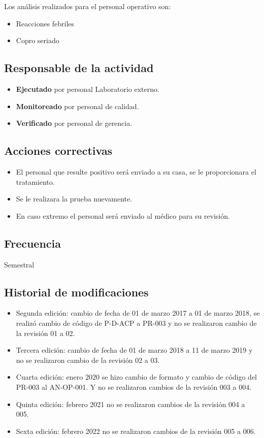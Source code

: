 Los análisis realizados para el personal operativo son:

\begin{itemize}
	\item Reacciones febriles
	\item Copro seriado
\end{itemize}

\subsection{Responsable de la actividad}

\begin{itemize}
	\item \textbf{Ejecutado} por personal Laboratorio externo.
	\item \textbf{Monitoreado} por personal de calidad.
	\item \textbf{Verificado} por personal de gerencia.
\end{itemize}

\subsection{Acciones correctivas}

\begin{itemize}
	\item El personal que resulte positivo será enviado a su casa, se le proporcionara el tratamiento.
	\item Se le realizara la prueba nuevamente.
	\item En caso extremo el personal será enviado al médico para su revisión.
\end{itemize}

\subsection{Frecuencia}

Semestral

\subsection{Historial de modificaciones}

\begin{itemize}
	\item Segunda edición: cambio de fecha de 01 de marzo 2017 a 01 de marzo 2018, se realizó cambio de código de P-D-ACP a PR-003 y no se realizaron cambio de la revisión 01 a 02.
	\item Tercera edición: cambio de fecha de 01 de marzo 2018 a 11 de marzo 2019 y no se realizaron cambio de la revisión 02 a 03.
	\item Cuarta edición: enero 2020 se hizo cambio de formato y cambio de código del PR-003 al AN-OP-001. Y no se realizaron cambios de la revisión 003 a 004.
	\item Quinta edición: febrero 2021 no se realizaron cambios de la revisión 004 a 005.
	\item Sexta edición: febrero 2022 no se realizaron cambios de la revisión 005 a 006.
\end{itemize}
